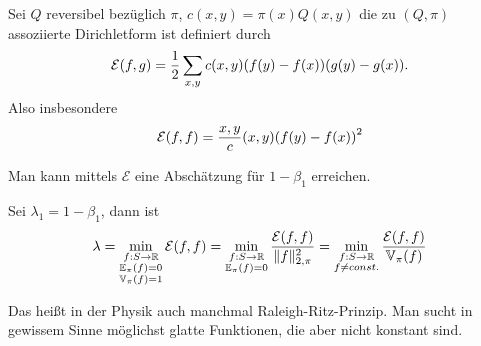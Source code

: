\begin{definition}
	Sei $Q$ reversibel bezüglich $\pi$, $c(x,y) = \pi(x) Q(x,y)$ die zu $(Q,\pi)$ assoziierte Dirichletform ist definiert durch
	\begin{align}
		\mathcal{E}(f,g) = \frac{1}{2}\sum\limits_{x,y}c(x,y)\enb{f(y) - f(x)}\enb{g(y)- g(x)}.
	\end{align}
	Also insbesondere
	\begin{align}
		\mathcal{E}(f,f) = \frac{x,y} c(x,y) \enb{f(y)-f(x)}^2
	\end{align}
\end{definition}

Man kann mittels $\mathcal{E}$ eine Abschätzung für $1-\beta_1$	erreichen.
\begin{satz}
	Sei $\lambda_1 = 1-\beta_1$, dann ist  
	\begin{align}
		\lambda = \min\limits_{\substack{f:S\to \RR \\ \EW{\relax}_{\pi}(f) = 0 \\ \Var{\relax}_{\pi}(f) = 1}} \mathcal{E}(f,f) = \min\limits_{\substack{f:S\to \RR \\ \EW{\relax}_{\pi} (f) = 0}} \frac{\mathcal{E}(f,f)}{\Norm{f}^2_{2,\pi}} = \min\limits_{\substack{f:S \to \RR \\ f \neq const.}} \frac{\mathcal{E}(f,f)}{\Var{\relax}_{\pi}(f)}
	\end{align}
\end{satz}
\begin{bemerkung}
	Das heißt in der Physik auch manchmal Raleigh-Ritz-Prinzip. Man sucht in gewissem Sinne möglichst glatte Funktionen, die aber nicht konstant sind.
\end{bemerkung}

